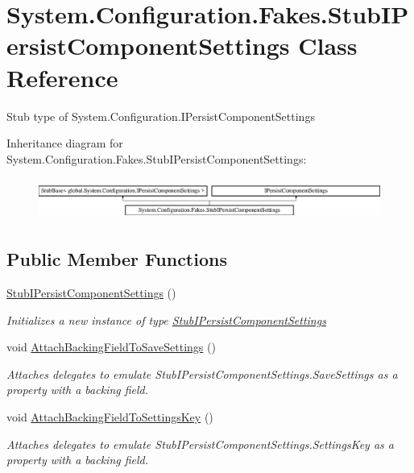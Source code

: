 \hypertarget{class_system_1_1_configuration_1_1_fakes_1_1_stub_i_persist_component_settings}{\section{System.\-Configuration.\-Fakes.\-Stub\-I\-Persist\-Component\-Settings Class Reference}
\label{class_system_1_1_configuration_1_1_fakes_1_1_stub_i_persist_component_settings}
}


Stub type of System.\-Configuration.\-I\-Persist\-Component\-Settings 


Inheritance diagram for System.\-Configuration.\-Fakes.\-Stub\-I\-Persist\-Component\-Settings\-:\begin{figure}[H]
\begin{center}
\leavevmode
\includegraphics[height=1.375921cm]{class_system_1_1_configuration_1_1_fakes_1_1_stub_i_persist_component_settings}
\end{center}
\end{figure}
\subsection*{Public Member Functions}
\begin{DoxyCompactItemize}
\item 
\hyperlink{class_system_1_1_configuration_1_1_fakes_1_1_stub_i_persist_component_settings_ab8f91c0f7544e33a56687a7c275fad39}{Stub\-I\-Persist\-Component\-Settings} ()
\begin{DoxyCompactList}\small\item\em Initializes a new instance of type \hyperlink{class_system_1_1_configuration_1_1_fakes_1_1_stub_i_persist_component_settings}{Stub\-I\-Persist\-Component\-Settings}\end{DoxyCompactList}\item 
void \hyperlink{class_system_1_1_configuration_1_1_fakes_1_1_stub_i_persist_component_settings_a76542a5cb75badd61560e35853621ef3}{Attach\-Backing\-Field\-To\-Save\-Settings} ()
\begin{DoxyCompactList}\small\item\em Attaches delegates to emulate Stub\-I\-Persist\-Component\-Settings.\-Save\-Settings as a property with a backing field.\end{DoxyCompactList}\item 
void \hyperlink{class_system_1_1_configuration_1_1_fakes_1_1_stub_i_persist_component_settings_ad9b5fe76840030b2dd46429fce5a39cd}{Attach\-Backing\-Field\-To\-Settings\-Key} ()
\begin{DoxyCompactList}\small\item\em Attaches delegates to emulate Stub\-I\-Persist\-Component\-Settings.\-Settings\-Key as a property with a backing field.\end{DoxyCompactList}\end{DoxyCompactItemize}
